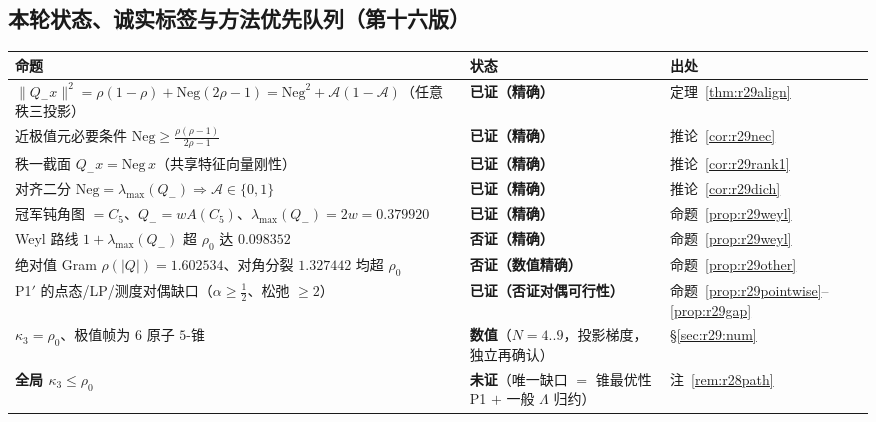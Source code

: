 \documentclass[UTF8,11pt]{ctexart}
\theoremstyle{definition}
\newcommand{\Lam}{\Lambda}
\begin{document}
\subsection{本轮状态、诚实标签与方法优先队列（第十六版）}\label{sec:r29:status}

\begin{center}\small
\begin{tabular}{p{}p{}p{}}
\toprule
命题 & 状态 & 出处\\
\midrule
$\|Q_-x\|^2=\rho(1-\rho)+\mathrm{Neg}(2\rho-1)=\mathrm{Neg}^2+\mathcal A(1-\mathcal A)$（任意秩三投影） & \textbf{已证（精确）} & 定理~\ref{thm:r29align}\\
近极值元必要条件 $\mathrm{Neg}\ge\frac{\rho(\rho-1)}{2\rho-1}$ & \textbf{已证（精确）} & 推论~\ref{cor:r29nec}\\
秩一截面 $Q_-x=\mathrm{Neg}\,x$（共享特征向量刚性） & \textbf{已证（精确）} & 推论~\ref{cor:r29rank1}\\
对齐二分 $\mathrm{Neg}=\lambda_{\max}(Q_-)\Rightarrow\mathcal A\in\{0,1\}$ & \textbf{已证（精确）} & 推论~\ref{cor:r29dich}\\
冠军钝角图 $=C_5$、$Q_-=wA(C_5)$、$\lambda_{\max}(Q_-)=2w=0.379920$ & \textbf{已证（精确）} & 命题~\ref{prop:r29weyl}\\
Weyl 路线 $1+\lambda_{\max}(Q_-)$ 超 $\rho_0$ 达 $0.098352$ & \textbf{否证（精确）} & 命题~\ref{prop:r29weyl}\\
绝对值 Gram $\rho(|Q|)=1.602534$、对角分裂 $1.327442$ 均超 $\rho_0$ & \textbf{否证（数值精确）} & 命题~\ref{prop:r29other}\\
P1$'$ 的点态/LP/测度对偶缺口（$\alpha\ge\frac12$、松弛 $\ge2$） & \textbf{已证（否证对偶可行性）} & 命题~\ref{prop:r29pointwise}--\ref{prop:r29gap}\\
$\kappa_3=\rho_0$、极值帧为 $6$ 原子 $5$-锥 & \textbf{数值}（$N=4..9$，投影梯度，独立再确认）& \S\ref{sec:r29:num}\\
\textbf{全局 $\kappa_3\le\rho_0$} & \textbf{未证}（唯一缺口 $=$ 锥最优性 P1 $+$ 一般 $\Lam$ 归约）& 注~\ref{rem:r28path}\\
\bottomrule
\end{tabular}
\end{center}
\end{document}
